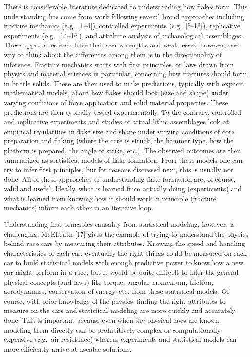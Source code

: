 \documentclass[10pt,letterpaper]{article}
\begin{document}
There is considerable literature dedicated to understanding how flakes
form. This understanding has come from work following several broad
approaches including fracture mechanics (e.g.~{[}1--4{]}), controlled
experiments (e.g.~{[}5--13{]}), replicative experiments
(e.g.~{[}14--16{]}), and attribute analysis of archaeological
assemblages. These approaches each have their own strengths and
weaknesses; however, one way to think about the differences among them
is in the directionality of inference. Fracture mechanics starts with
first principles, or laws drawn from physics and material sciences in
particular, concerning how fractures should form in brittle solids.
These are then used to make predictions, typically with explicit
mathematical models, about how flakes should look (size and shape) under
varying conditions of force application and solid material properties.
These predictions are then typically tested experimentally. To the
contrary, controlled and replicative experiments and studies of actual
lithic assemblages look at empirical regularities in flake size and
shape under varying conditions of core preparation and flaking (where
the core is struck, the hammer type, how the platform is prepared, the
angle of strike, etc.). The observed outcomes are then summarized as
statistical models of flake formation. From these models one can try to
infer first principles, but for reasons discussed next, this is usually
not done. All of these approaches to understanding flake formation are,
of course, valid and useful. Ideally, what is learned from actually
doing (experiments) and what is learned from knowing how it should work
in principle (fracture mechanics) inform each other in an iterative
loop.

Understanding first principles causality from statistical modeling,
however, is challenging. McElreath {[}17{]} gives the example of trying
to understand the physics behind race cars by measuring their
attributes. Knowing the speed and handling characteristics of each car,
eventually the right things could be measured on each car to build
statistical models with enough predictive power to know how a new car
might perform in a race, but it would be quite difficult to infer the
general physical concepts (and laws) like torque, angular momentum,
friction, aerodynamics, conservation of energy, etc. from these
statistical models. Of course, with prior knowledge of the physics,
finding the right attributes to measure on the cars and statistical
modeling are more quickly and accurately done. This is important because
even when the physical laws are known, modeling them directly can be
prohibitively complex or computationally expensive (e.g.~air resistance)
whereas experiments and statistical models can more efficiently arrive
at useable solutions.
\end{document}
